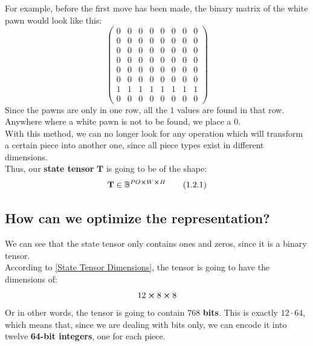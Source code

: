 \documentclass[12pt]{article}
\begin{document}
\noindent
For example, before the first move has been made, the binary matrix of the white pawn would look like this:
\begin{equation*}
	\begin{pmatrix}
		0 & 0 & 0 & 0 & 0 & 0 & 0 & 0 \\
		0 & 0 & 0 & 0 & 0 & 0 & 0 & 0 \\
		0 & 0 & 0 & 0 & 0 & 0 & 0 & 0 \\
		0 & 0 & 0 & 0 & 0 & 0 & 0 & 0 \\
		0 & 0 & 0 & 0 & 0 & 0 & 0 & 0 \\
		0 & 0 & 0 & 0 & 0 & 0 & 0 & 0 \\
		1 & 1 & 1 & 1 & 1 & 1 & 1 & 1 \\
		0 & 0 & 0 & 0 & 0 & 0 & 0 & 0
	\end{pmatrix}
\end{equation*}
Since the pawns are only in one row, all the \(1\) values are found in that row. Anywhere where a white pawn is not to be found, we place a \(0\). \\
With this method, we can no longer look for any operation which will transform a certain piece into another one, since all piece types exist in different dimensions. \\
Thus, our \textbf{state tensor} \(\mathbf{T}\) is going to be of the shape:
\begin{equation}
	\mathbf{T} \in \mathbb{B}^{PO \cross W \cross H} \label{State Tensor Dimensions} \tag{1.2.1}
\end{equation}

\newpage

\subsection{How can we optimize the representation?}
We can see that the state tensor only contains ones and zeros, since it is a binary tensor. \\
According to \eqref{State Tensor Dimensions}, the tensor is going to have the dimensions of:
\begin{equation*}
	12 \cross 8 \cross 8
\end{equation*}
Or in other words, the tensor is going to contain \(768\) \textbf{bits}. This is exactly \(12 \cdot 64\), which means that, since we are dealing with bits only, we can encode it into twelve \textbf{64-bit integers}, one for each piece.
\end{document}
